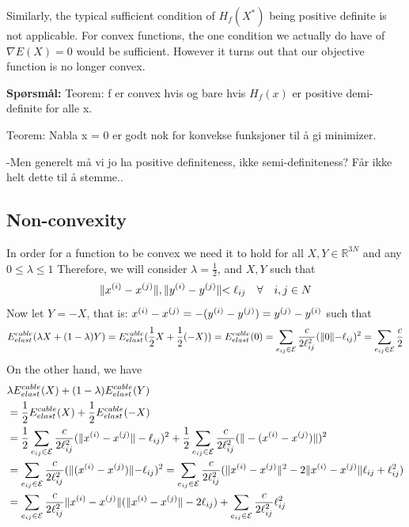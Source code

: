 Similarly, the typical sufficient condition of $H_f(X^*)$ being positive definite is not applicable. For convex functions, the one condition we actually do have of $\nabla E(X)=0$ would be sufficient. However it turns out that our objective function is no longer convex.

\textbf{Spørsmål:} 
Teorem: 
f er convex hvis og bare hvis $H_f(x)$ er positive demi-definite for alle x.

Teorem: Nabla x = 0 er godt nok for konvekse funksjoner til å gi minimizer. 

-Men generelt må vi jo ha positive definiteness, ikke semi-definiteness? Får ikke helt dette til å stemme..

\subsection{Non-convexity}
In order for a function to be convex we need it to hold for all $X,Y \in \mathbb{R}^{3N}$ and any $0\leq \lambda \leq 1$ Therefore, we will consider $\lambda = \frac{1}{2}$, and $X,Y$ such that 
\begin{equation*}
    \rVert x^{(i)}-x^{(j)} \lVert, \rVert y^{(i)}-y^{(j)} \lVert < \ell_{ij} \quad \forall \quad i,j \in N
\end{equation*}
Now let $Y = -X$, that is: $x^{(i)}-x^{(j)} = -(y^{(i)}-y^{(j)}) = y^{(j)}-y^{(i)}$ such that
\begin{equation}
    \label{energyConv1}
    E^{cable}_{elast}(\lambda X + (1-\lambda) Y) = E^{cable}_{elast}(\frac{1}{2}X + \frac{1}{2}(-X)) = E^{cable}_{elast}(0) = \sum\limits_{e_{ij} \in \mathcal{E}} \frac{c}{2 \ell_{ij}^2} ( \rVert 0 \lVert - \ell_{ij})^2 = \sum\limits_{e_{ij} \in \mathcal{E}}\frac{c}{2}
\end{equation}
On the other hand, we have
\begin{equation}
\label{energyConv2}
\begin{aligned}    
    &\lambda E^{cable}_{elast}(X) + (1-\lambda)E^{cable}_{elast}(Y) \\&= \frac{1}{2}E^{cable}_{elast}(X) + \frac{1}{2}E^{cable}_{elast}(-X) \\& 
    = \frac{1}{2}\sum\limits_{e_{ij} \in \mathcal{E}} \frac{c}{2\ell_{ij}^2} (\lVert x^{(i)} - x^{(j)}\rVert - \ell_{ij})^2 + \frac{1}{2} \sum\limits_{e_{ij} \in \mathcal{E}}\frac{c}{2\ell_{ij}^2} (\rVert-(x^{(i)}-x^{(j)})\lVert)^2\\
    &= \sum\limits_{e_{ij} \in \mathcal{E}}\frac{c}{2\ell_{ij}^2}(\rVert(x^{(i)}-x^{(j)})\lVert - \ell_{ij} )^2= \sum\limits_{e_{ij} \in \mathcal{E}}\frac{c}{2\ell_{ij}^2} (\lVert x^{(i)} - x^{(j)}\rVert^2 - 2\lVert x^{(i)} - x^{(j)}\rVert \ell_{ij} + \ell_{ij}^2) \\
    &=\sum\limits_{e_{ij} \in \mathcal{E}}\frac{c}{2\ell_{ij}^2} \lVert x^{(i)} - x^{(j)}\rVert (\lVert x^{(i)} - x^{(j)}\rVert - 2 \ell_{ij}) + \sum\limits_{e_{ij} \in \mathcal{E}}\frac{c}{2\ell_{ij}^2}\ell_{ij}^2
    \end{aligned}
\end{equation}

